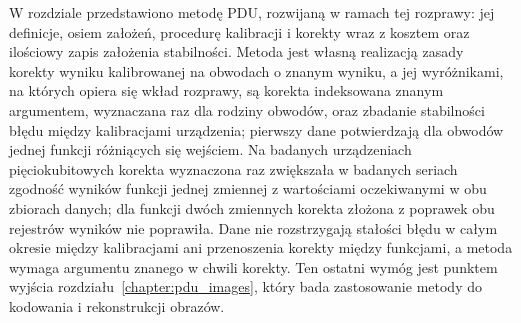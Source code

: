 W rozdziale przedstawiono metodę PDU, rozwijaną w ramach tej rozprawy: jej definicje, osiem założeń, procedurę kalibracji i korekty wraz z kosztem oraz ilościowy zapis założenia stabilności.
Metoda jest własną realizacją zasady korekty wyniku kalibrowanej na obwodach o znanym wyniku, a jej wyróżnikami, na których opiera się wkład rozprawy, są korekta indeksowana znanym argumentem, wyznaczana raz dla rodziny obwodów, oraz zbadanie stabilności błędu między kalibracjami urządzenia; pierwszy dane potwierdzają dla obwodów jednej funkcji różniących się wejściem.
Na badanych urządzeniach pięciokubitowych korekta wyznaczona raz zwiększała w badanych seriach zgodność wyników funkcji jednej zmiennej z wartościami oczekiwanymi w obu zbiorach danych; dla funkcji dwóch zmiennych korekta złożona z poprawek obu rejestrów wyników nie poprawiła.
Dane nie rozstrzygają stałości błędu w całym okresie między kalibracjami ani przenoszenia korekty między funkcjami, a metoda wymaga argumentu znanego w chwili korekty.
Ten ostatni wymóg jest punktem wyjścia rozdziału~\ref{chapter:pdu_images}, który bada zastosowanie metody do kodowania i rekonstrukcji obrazów.
